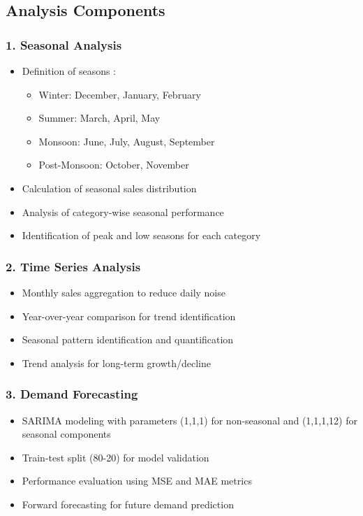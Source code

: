 \documentclass[11pt,a4paper]{article}
\begin{document}
\subsection{Analysis Components}
\subsubsection{1. Seasonal Analysis}
\begin{itemize}
    \item Definition of seasons :
        \begin{itemize}
            \item Winter: December, January, February
            \item Summer: March, April, May
            \item Monsoon: June, July, August, September
            \item Post-Monsoon: October, November
        \end{itemize}
    \item Calculation of seasonal sales distribution
    \item Analysis of category-wise seasonal performance
    \item Identification of peak and low seasons for each category
\end{itemize}

\subsubsection{2. Time Series Analysis}
\begin{itemize}
    \item Monthly sales aggregation to reduce daily noise
    \item Year-over-year comparison for trend identification
    \item Seasonal pattern identification and quantification
    \item Trend analysis for long-term growth/decline
\end{itemize}

\subsubsection{3. Demand Forecasting}
\begin{itemize}
    \item SARIMA modeling with parameters (1,1,1) for non-seasonal and (1,1,1,12) for seasonal components
    \item Train-test split (80-20) for model validation
    \item Performance evaluation using MSE and MAE metrics
    \item Forward forecasting for future demand prediction
\end{itemize}
\end{document}
